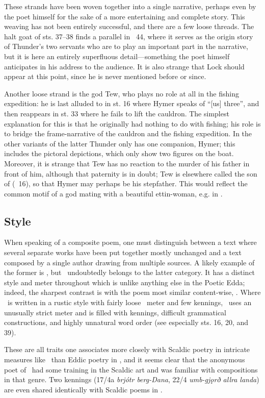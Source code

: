 {These strands have been woven together into a single narrative, perhaps even by the poet himself for the sake of a more entertaining and complete story. This weaving has not been entirely successful, and there are a few loose threads.  The halt goat of sts. 37–38 finds a parallel in \Gylfaginning\ 44, where it serves as the origin story of Thunder’s two servants who are to play an important part in the narrative, but it is here an entirely superfluous detail—something the poet himself anticipates in his address to the audience.  It is also strange that Lock should appear at this point, since he is never mentioned before or since.

Another loose strand is the god Tew, who plays no role at all in the fishing expedition: he is last alluded to in st. 16 where Hymer speaks of “[us] three”, and then reappears in st. 33 where he fails to lift the cauldron.  The simplest explanation for this is that he originally had nothing to do with fishing; his role is to bridge the frame-narrative of the cauldron and the fishing expedition.  In the other variants of the latter Thunder only has one companion, Hymer; this includes the pictoral depictions, which only show two figures on the boat.  Moreover, it is strange that Tew has no reaction to the murder of his father in front of him, although that paternity is in doubt; Tew is elsewhere called the son of  (\Skaldskaparmal\ 16), so that Hymer may perhaps be his stepfather.  This would reflect the common motif of a god mating with a beautiful ettin-woman, e.g. in \Skirnismal.}

\subsection{Style}

{\small When speaking of a composite poem, one must distinguish between a text where several separate works have been put together mostly unchanged and a text composed by a single author drawing from multiple sources.  A likely example of the former is \Havamal, but \Hymiskvida\ undoubtedly belongs to the latter category.  It has a distinct style and meter throughout which is unlike anything else in the Poetic Edda; indeed, the sharpest contrast is with the poem most similar content-wise, \Thrymskvida.  Where \Thrymskvida\ is written in a rustic style with fairly loose \Fornyrdislag\ meter and few kennings, \Hymiskvida\ uses an unusually strict meter and is filled with kennings, difficult grammatical constructions, and highly unnatural word order (see especially sts. 16, 20, and 39).

These are all traits one associates more closely with Scaldic poetry in intricate measures like \Drottkvett\ than Eddic poetry in \Fornyrdislag, and it seems clear that the anonymous poet of \Hymiskvida\ had some training in the Scaldic art and was familiar with compositions in that genre.  Two kennings (17/4a \emph{brjótr berg-Dana}, 22/4 \emph{umb-gjǫrð allra landa}) are even shared identically with Scaldic poems in \Drottkvett.}

